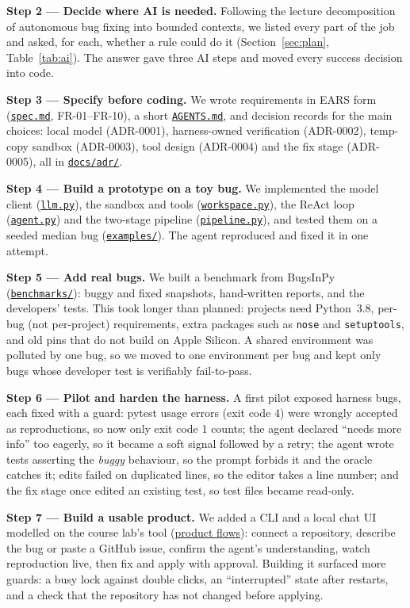 \documentclass[manuscript,screen,nonacm]{acmart}
\newcommand{\repo}{https://github.com/keshavdubeyy/reproagent_autose}
\newcommand{\rlink}[2]{\href{\repo/blob/main/#1}{#2}}
\begin{document}
\textbf{Step 2 --- Decide where AI is needed.} Following the lecture decomposition of autonomous bug fixing into bounded contexts,
we listed every part of the job and asked, for each, whether a rule could do it (Section~\ref{sec:plan}, Table~\ref{tab:ai}).
The answer gave three AI steps and moved every success decision into code.

\textbf{Step 3 --- Specify before coding.} We wrote requirements in EARS form (\rlink{docs/spec.md}{\texttt{spec.md}}, FR-01--FR-10),
a short \rlink{AGENTS.md}{\texttt{AGENTS.md}}, and decision records for the main choices: local model (ADR-0001), harness-owned verification (ADR-0002),
temp-copy sandbox (ADR-0003), tool design (ADR-0004) and the fix stage (ADR-0005), all in \rlink{docs/adr}{\texttt{docs/adr/}}.

\textbf{Step 4 --- Build a prototype on a toy bug.} We implemented the model client (\rlink{reproagent/llm.py}{\texttt{llm.py}}), the sandbox and tools
(\rlink{reproagent/workspace.py}{\texttt{workspace.py}}), the ReAct loop (\rlink{reproagent/agent.py}{\texttt{agent.py}}) and the two-stage pipeline
(\rlink{reproagent/pipeline.py}{\texttt{pipeline.py}}), and tested them on a seeded median bug (\rlink{examples}{\texttt{examples/}}).
The agent reproduced and fixed it in one attempt.

\textbf{Step 5 --- Add real bugs.} We built a benchmark from BugsInPy (\rlink{benchmarks}{\texttt{benchmarks/}}): buggy and fixed snapshots,
hand-written reports, and the developers' tests. This took longer than planned: projects need Python~3.8, per-bug (not per-project) requirements,
extra packages such as \texttt{nose} and \texttt{setuptools}, and old pins that do not build on Apple Silicon. A shared environment was polluted by one bug,
so we moved to one environment per bug and kept only bugs whose developer test is verifiably fail-to-pass.

\textbf{Step 6 --- Pilot and harden the harness.} A first pilot exposed harness bugs, each fixed with a guard:
pytest usage errors (exit code 4) were wrongly accepted as reproductions, so now only exit code 1 counts;
the agent declared ``needs more info'' too eagerly, so it became a soft signal followed by a retry;
the agent wrote tests asserting the \emph{buggy} behaviour, so the prompt forbids it and the oracle catches it;
edits failed on duplicated lines, so the editor takes a line number; and the fix stage once edited an existing test, so test files became read-only.

\textbf{Step 7 --- Build a usable product.} We added a CLI and a local chat UI modelled on the course lab's tool (\rlink{docs/product-flows.md}{product flows}):
connect a repository, describe the bug or paste a GitHub issue, confirm the agent's understanding, watch reproduction live, then fix and apply with approval.
Building it surfaced more guards: a busy lock against double clicks, an ``interrupted'' state after restarts, and a check that the repository
has not changed before applying.
\end{document}
